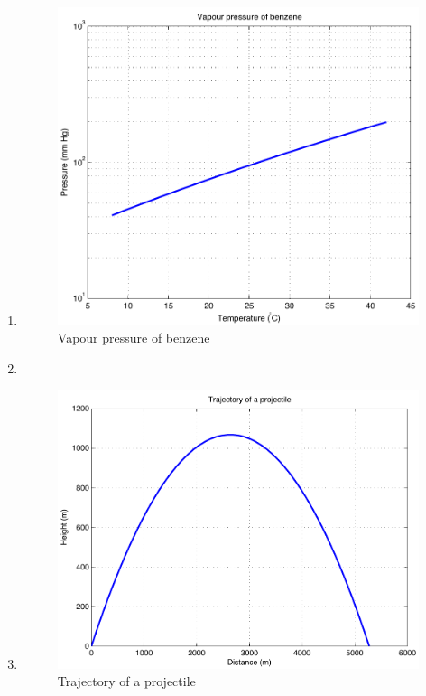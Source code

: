 \begin{enumerate}
\clearpage
\item 
\begin{figure}[h]
	\myfloatalign
	\includegraphics[width=0.9\linewidth]{Graphics/Additional-Ex/benzene}
	\caption{Vapour pressure of benzene}
	\label{fig:benzene}
\end{figure}

\newpage
\item 

\newpage
\item 
\begin{figure}[h]
	\myfloatalign
	\includegraphics[width=\linewidth]{Graphics/Additional-Ex/trajectory}
	\caption{Trajectory of a projectile}
	\label{fig:trajectory}
\end{figure}


\end{enumerate}
